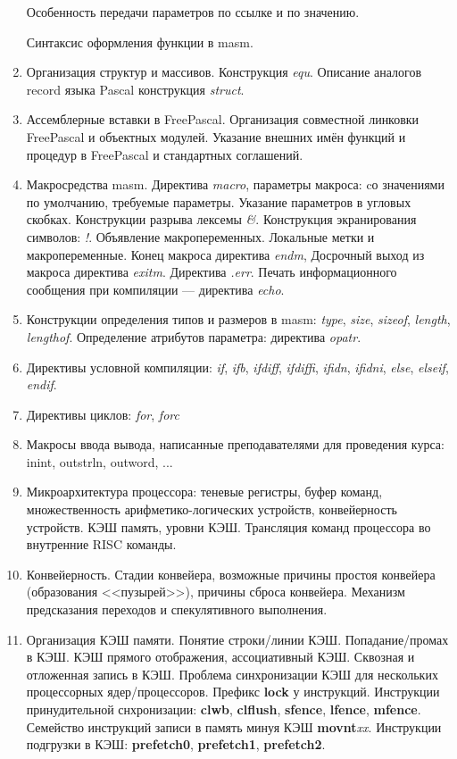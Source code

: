 \documentclass[a4paper,10pt]{article}
\begin{document}
\begin{enumerate}
        Особенность передачи параметров по ссылке и по значению.
    
        Синтаксис оформления функции в masm.
    \item
        Организация структур и массивов. Конструкция \textit{equ}. Описание аналогов record языка Pascal конструкция \textit{struct}.
    \item
        Ассемблерные вставки в FreePascal. Организация совместной линковки FreePascal и объектных модулей. Указание внешних имён функций и процедур
        в FreePascal и стандартных соглашений.
    \item
        Макросредства masm. Директива \textit{macro}, параметры макроса: cо значениями по умолчанию, требуемые параметры. Указание параметров 
        в угловых скобках. Конструкции разрыва лексемы \textit{\&}. Конструкция экранирования символов: \textit{!}.
        Объявление макропеременных. Локальные метки и макропеременные. Конец макроса директива \textit{endm},
        Досрочный выход из макроса директива \textit{exitm}. Директива \textit{.err}. Печать информационного сообщения при компиляции  --- директива
        \textit{echo}.
    \item
        Конструкции определения типов и размеров в masm: \textit{type}, \textit{size}, \textit{sizeof}, \textit{length}, \textit{lengthof}.
        Определение атрибутов параметра: директива \textit{opatr}.
    \item
        Директивы условной компиляции: \textit{if}, \textit{ifb}, \textit{ifdiff}, \textit{ifdiffi},
                     \textit{ifidn}, \textit{ifidni}, \textit{else}, \textit{elseif}, \textit{endif}.
    \item
        Директивы циклов: \textit{for}, \textit{forc}
    \item
        Макросы ввода вывода, написанные преподавателями для проведения курса: inint, outstrln, outword, ...
    \item
        Микроархитектура процессора: теневые регистры, буфер команд, множественность арифметико-логических устройств, конвейерность устройств.
        КЭШ память, уровни КЭШ. Трансляция команд процессора во внутренние RISC команды.
    \item
        Конвейерность. Стадии конвейера, возможные причины простоя конвейера (образования <<пузырей>>), причины сброса конвейера.
        Механизм предсказания переходов и спекулятивного выполнения.
    \item
        Организация КЭШ памяти. Понятие строки/линии КЭШ. Попадание/промах в КЭШ. КЭШ прямого отображения, ассоциативный КЭШ.
        Сквозная и отложенная запись в КЭШ. Проблема синхронизации КЭШ для нескольких процессорных ядер/процессоров.
        Префикс \textbf{lock} у инструкций. Инструкции принудительной снхронизации: \textbf{clwb}, \textbf{clflush}, \textbf{sfence}, \textbf{lfence},
        \textbf{mfence}. Семейство инструкций записи в память минуя КЭШ \textbf{movnt}\textit{xx}.
        Инструкции подгрузки в КЭШ: \textbf{prefetch0}, \textbf{prefetch1}, \textbf{prefetch2}.
    

\end{enumerate}
\end{document}
